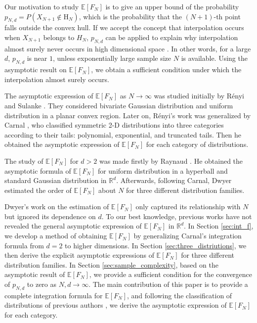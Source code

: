 \documentclass[conference,a4paper]{IEEEtran}
\def\E{\mathbb{E}}
\def\R{\mathbb{R}}
\begin{document}
Our motivation to study $\E[F_N]$ is to give an upper bound of
the probability $p_{N,d}=P(X_{N+1} \not\in \mathrm{H}_N)$,
which is the probability that the $(N+1)$-th point falls outside the convex hull.
If we accept the concept that interpolation occurs when $X_{N+1}$ belongs to $H_N$,
$p_{N,d}$ can be applied to explain
why interpolation almost surely never occurs in high dimensional space \cite{balestriero2021learning}.
In other words, for a large $d$, $p_{N,d}$ is near $1$, unless exponentially large sample size $N$ is available.
Using the asymptotic result on $\E[F_N]$, we obtain
a sufficient condition under which the interpolation almost surely occurs.


The asymptotic expression of $\E[F_N]$ as $N\to \infty$
was studied initially by R{\'e}nyi and Sulanke \cite{renyi1963konvexe}.
They considered
bivariate Gaussian distribution and uniform distribution
in a planar convex region.
Later on,  R{\'e}nyi's work was generalized by
Carnal \cite{carnal1970konvexe}, who
classified symmetric 2-D distributions
into three categories according to their tails:
polynomial, exponential, and truncated tails.
Then he obtained the asymptotic expression of $\E[F_N]$
for each category of distributions.




The study of $\E[F_N]$ for $d>2$ was made firstly by
Raynaud
\cite{raynaud1970enveloppe}.
He obtained the asymptotic formula of $\E[F_N]$
for uniform distribution in a hyperball
and standard Gaussian distribution in $\mathbb{R}^d$.
Afterwards, following Carnal, Dwyer \cite{dwyer1991convex}
estimated the order of $\E[F_N]$ about $N$
for three different distribution families.

Dwyer's work on the estimation of $\E[F_N]$ only captured its relationship with $N$ but ignored its
dependence on $d$. To our best knowledge, previous works have not revealed the general asymptotic expression of $\E[F_N]$ in $\R^d$.
In Section \ref{sec:int_f}, we develop a method of obtaining $\E[F_N]$ by generalizing Carnal's integration formula
from $d=2$ to higher dimensions.
In Section \ref{sec:three_distriutions}, we then derive the explicit asymptotic
expressions of $\E[F_N]$ for three different distribution families.
In Section \ref{sec:sample_complexity}, based on the asymptotic result of $\E[F_N]$,
we provide a sufficient condition for the convergence of $p_{N,d}$ to zero as $N,d \to \infty$.
The main contribution of this paper is to provide a complete integration formula for $\E[F_N]$,
and following the classification of distributions of previous authors \cite{carnal1970konvexe,dwyer1991convex},
we derive the asymptotic expression
of $\E[F_N]$ for each category.
\end{document}
